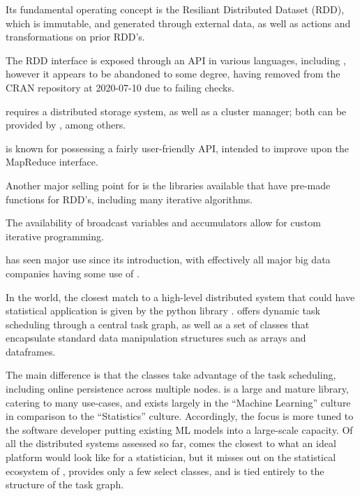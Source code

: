 Its fundamental operating concept is the Resiliant Distributed Dataset
(RDD), which is immutable, and generated through external data, as well
as actions and transformations on prior RDD's.

The RDD interface is exposed through an API in various languages,
including \R{}, however it appears to be abandoned to some degree, having
removed from the CRAN repository at 2020-07-10 due to failing checks.

 requires a distributed storage system, as well as a cluster
manager; both can be provided by , among others.

 is known for possessing a fairly user-friendly API, intended to
improve upon the MapReduce interface.

Another major selling point for  is the libraries available that
have pre-made functions for RDD's, including many iterative algorithms.

The availability of broadcast variables and accumulators allow for
custom iterative programming.

 has seen major use since its introduction, with effectively all
major big data companies having some use of .

In the  world, the closest match to a high-level distributed
system that could have statistical application is given by the python
library \cite{rocklin2015dask}.  offers
dynamic task scheduling through a central task graph, as well as a set
of classes that encapsulate standard data manipulation structures such
as  arrays and  dataframes.

The main difference is that the  classes take advantage of
the task scheduling, including online persistence across multiple nodes.
 is a large and mature library, catering to many use-cases,
and exists largely in the  ``Machine Learning'' culture in
comparison to the \R{} ``Statistics'' culture. Accordingly, the focus is
more tuned to the  software developer putting existing ML models
into a large-scale capacity. Of all the distributed systems assessed so
far,  comes the closest to what an ideal platform would
look like for a statistician, but it misses out on the statistical
ecosystem of \R{}, provides only a few select classes, and is tied entirely
to the structure of the task graph.
